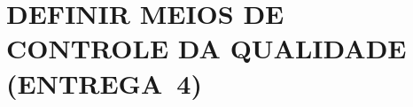     \section{DEFINIR MEIOS DE CONTROLE DA QUALIDADE (ENTREGA~4)}\label{sec:definir_meios_de_controle_da_qualidade}